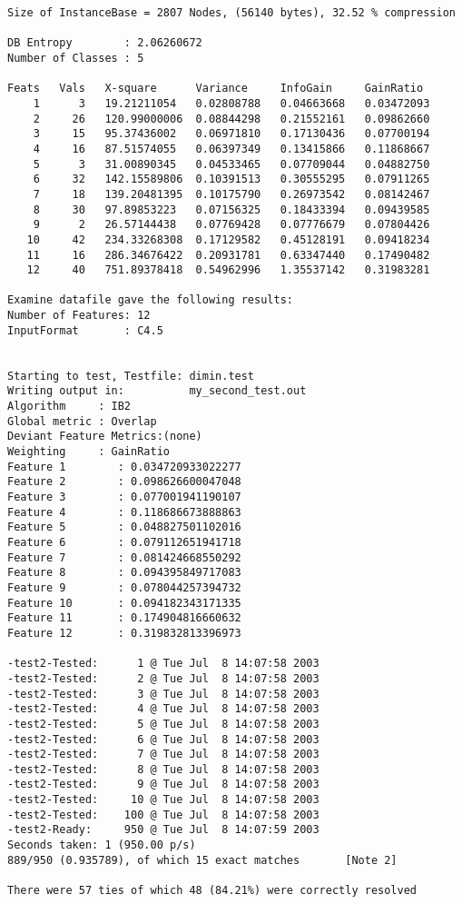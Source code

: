 \begin{verbatim}
Size of InstanceBase = 2807 Nodes, (56140 bytes), 32.52 % compression

DB Entropy        : 2.06260672
Number of Classes : 5

Feats   Vals   X-square      Variance     InfoGain     GainRatio
    1      3   19.21211054   0.02808788   0.04663668   0.03472093
    2     26   120.99000006  0.08844298   0.21552161   0.09862660
    3     15   95.37436002   0.06971810   0.17130436   0.07700194
    4     16   87.51574055   0.06397349   0.13415866   0.11868667
    5      3   31.00890345   0.04533465   0.07709044   0.04882750
    6     32   142.15589806  0.10391513   0.30555295   0.07911265
    7     18   139.20481395  0.10175790   0.26973542   0.08142467
    8     30   97.89853223   0.07156325   0.18433394   0.09439585
    9      2   26.57144438   0.07769428   0.07776679   0.07804426
   10     42   234.33268308  0.17129582   0.45128191   0.09418234
   11     16   286.34676422  0.20931781   0.63347440   0.17490482
   12     40   751.89378418  0.54962996   1.35537142   0.31983281

Examine datafile gave the following results:
Number of Features: 12
InputFormat       : C4.5


Starting to test, Testfile: dimin.test
Writing output in:          my_second_test.out
Algorithm     : IB2
Global metric : Overlap
Deviant Feature Metrics:(none)
Weighting     : GainRatio
Feature 1        : 0.034720933022277
Feature 2        : 0.098626600047048
Feature 3        : 0.077001941190107
Feature 4        : 0.118686673888863
Feature 5        : 0.048827501102016
Feature 6        : 0.079112651941718
Feature 7        : 0.081424668550292
Feature 8        : 0.094395849717083
Feature 9        : 0.078044257394732
Feature 10       : 0.094182343171335
Feature 11       : 0.174904816660632
Feature 12       : 0.319832813396973

-test2-Tested:      1 @ Tue Jul  8 14:07:58 2003
-test2-Tested:      2 @ Tue Jul  8 14:07:58 2003
-test2-Tested:      3 @ Tue Jul  8 14:07:58 2003
-test2-Tested:      4 @ Tue Jul  8 14:07:58 2003
-test2-Tested:      5 @ Tue Jul  8 14:07:58 2003
-test2-Tested:      6 @ Tue Jul  8 14:07:58 2003
-test2-Tested:      7 @ Tue Jul  8 14:07:58 2003
-test2-Tested:      8 @ Tue Jul  8 14:07:58 2003
-test2-Tested:      9 @ Tue Jul  8 14:07:58 2003
-test2-Tested:     10 @ Tue Jul  8 14:07:58 2003
-test2-Tested:    100 @ Tue Jul  8 14:07:58 2003
-test2-Ready:     950 @ Tue Jul  8 14:07:59 2003
Seconds taken: 1 (950.00 p/s)
889/950 (0.935789), of which 15 exact matches       [Note 2]

There were 57 ties of which 48 (84.21%) were correctly resolved
\end{verbatim}

